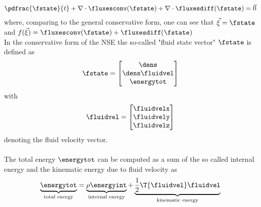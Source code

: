 \documentclass[../main.tex]{subfiles}
\begin{document}
\begin{align}\label{eq:nsg_conservative_form}
\pdfrac{\fstate}{t} + \nabla \cdot \fluxesconv(\fstate) + \nabla \cdot \fluxesdiff(\fstate) = \vec{0}
\end{align}
where, comparing to the general conservative form, one can see that $\vec{\xi}=\fstate$ and $f(\vec{\xi})=\fluxesconv(\fstate) +\fluxesdiff(\fstate)$
 \\
In the conservative form of the \ac{NSE} the so-called "fluid state vector" $\fstate$ is defined as
\begin{align}\label{eq:fstate_definition}
\fstate=
\begin{bmatrix}
  \dens            \\
  \dens \fluidvel  \\
  \energytot          \\
\end{bmatrix}
\end{align}
with
\begin{align}\label{eq:fluidvel_definition}
\fluidvel=
\begin{bmatrix}
  \fluidvelx  \\
  \fluidvely  \\
  \fluidvelz  \\
\end{bmatrix}
\end{align}
denoting the fluid velocity vector.
 \\
 \\
The total energy $\energytot$ can be computed as a sum of the so called internal energy and the kinematic energy due to fluid velocity as
\begin{align}\label{eq:energytot}
\underbrace{\energytot}_{\text{total energy}} = \underbrace{\rho \energyint}_{\text{internal energy}} + \underbrace{\frac{1}{2} \T{\fluidvel} \fluidvel}_{\text{kinematic energy}}
\end{align}
\end{document}
